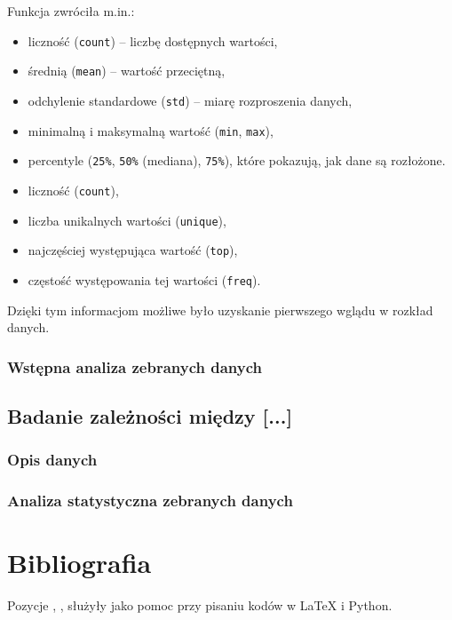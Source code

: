 \documentclass[12pt,a4paper]{article}
\begin{document}
Funkcja zwróciła m.in.:
\begin{itemize}
    \item liczność (\texttt{count}) – liczbę dostępnych wartości,
    \item średnią (\texttt{mean}) – wartość przeciętną,
    \item odchylenie standardowe (\texttt{std}) – miarę rozproszenia danych,
    \item minimalną i maksymalną wartość (\texttt{min}, \texttt{max}),
    \item percentyle (\texttt{25\%}, \texttt{50\%} (mediana), \texttt{75\%}), które pokazują, jak dane są rozłożone.
    \item liczność (\texttt{count}),
    \item liczba unikalnych wartości (\texttt{unique}),
    \item najczęściej występująca wartość (\texttt{top}),
    \item częstość występowania tej wartości (\texttt{freq}).
\end{itemize}

Dzięki tym informacjom możliwe było uzyskanie pierwszego wglądu w rozkład danych.

\newpage
\subsubsection{Wstępna analiza zebranych danych}





\newpage
\subsection{Badanie zależności między [...]}
\subsubsection{Opis danych}
\subsubsection{Analiza statystyczna zebranych danych}


\newpage


\section{Bibliografia}

Pozycje \cite{gitkkozlowski}, \cite{pandas}, \cite{statsmodels} służyły jako pomoc przy pisaniu kodów w LaTeX i Python.


\end{document}
